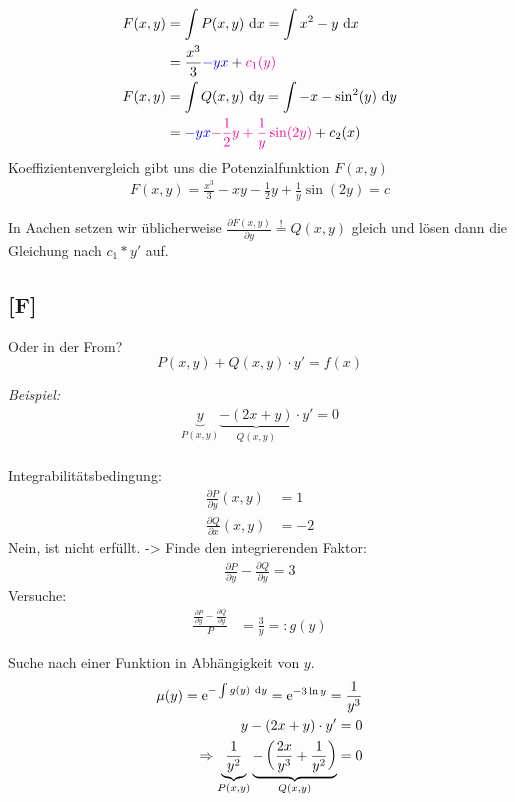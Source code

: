\documentclass[main.tex]{subfiles}
\begin{document}
\begin{align*}
	F(x,y) &= \int P(x,y) ~\mathrm{d}x = \int x^2 -y ~\mathrm{d}x \\
		&= \frac{x^3}{3} \textcolor{blue}{-y x} + \textcolor{magenta}{c_1(y)} \\
	F(x,y) &= \int Q(x,y) ~\mathrm{d}y = \int -x - \sin^2(y) ~\mathrm{d}y \\
		&= \textcolor{blue}{-y x} \textcolor{magenta}{-\frac{1}{2}y + \frac{1}{y} \sin(2 y)} + c_2(x)\\
\end{align*}
Koeffizientenvergleich gibt uns die Potenzialfunktion $F(x,y)$
\begin{align*}
	F(x,y) = \frac{x^3}{3} -xy -\frac{1}{2}y + \frac{1}{y} \sin(2 y) = c
\end{align*}

In Aachen setzen wir üblicherweise $\frac{\partial F(x,y)}{\partial y} \overset{!}{=} Q(x,y)$ gleich und lösen dann die Gleichung nach $c_1 * y'$ auf.

\subsection{[F]}
\vspace{6cm}
Oder in der From? 
$$
	P(x,y) + Q(x,y)\cdot y' = f(x)
$$

\textit{Beispiel:}
\begin{align*}
	\underbrace{y}_{P(x,y)} \underbrace{- (2x +y)}_{Q(x,y)} \cdot y' = 0 \\
\end{align*}

Integrabilitätsbedingung:
\begin{align*}
	\frac{\partial P}{\partial y}(x,y) &= 1 \\
	\frac{\partial Q}{\partial x}(x,y) &= -2 
\end{align*}
Nein, ist nicht erfüllt. 
-> Finde den integrierenden Faktor:
\begin{align*}
	\frac{\partial P}{\partial y} - \frac{\partial Q}{\partial y} = 3
\end{align*}
Versuche: 
\begin{align*}
	\frac{\frac{\partial P}{\partial y} - \frac{\partial Q}{\partial y}}{P} 
	&= \frac{3}{y} =: g(y)
\end{align*}

Suche nach einer Funktion in Abhängigkeit von $y$. 
\begin{align*}
	\mu(y) = \operatorname{\mathrm{e}}^{-\int g(y)~\mathrm{d}y} = \operatorname{\mathrm{e}}^{-3\ln y} = \frac{1}{y^3} \\
	y-(2x +y) \cdot y' = 0 \\
	\Rightarrow \underbrace{\frac{1}{y^2}}_{P(x,y)} \underbrace{ -\left(\frac{2x}{y^3} + \frac{1}{y^2} \right)}_{Q(x,y)} = 0
\end{align*}
\end{document}
